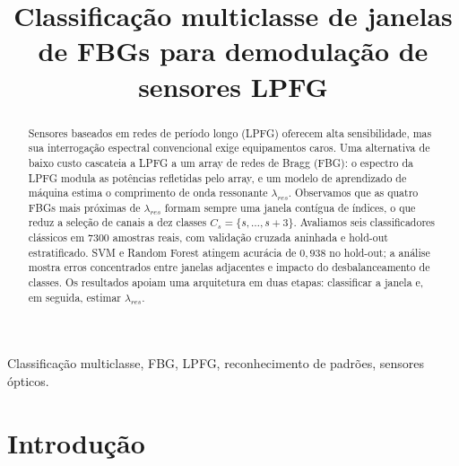 \documentclass[conference]{IEEEtran}
\begin{document}
\title{Classificação multiclasse de janelas de FBGs para demodulação de sensores LPFG}

\author{
\and
{}
}

\maketitle

\begin{abstract}
Sensores baseados em redes de período longo (LPFG) oferecem alta sensibilidade, mas sua interrogação espectral convencional exige equipamentos caros.
Uma alternativa de baixo custo cascateia a LPFG a um array de redes de Bragg (FBG): o espectro da LPFG modula as potências refletidas pelo array, e um modelo de aprendizado de máquina estima o comprimento de onda ressonante $\lambda_{res}$.
Observamos que as quatro FBGs mais próximas de $\lambda_{res}$ formam sempre uma janela contígua de índices, o que reduz a seleção de canais a dez classes $C_s=\{s,\ldots,s+3\}$.
Avaliamos seis classificadores clássicos em $7300$ amostras reais, com validação cruzada aninhada e hold-out estratificado.
SVM e Random Forest atingem acurácia de $0{,}938$ no hold-out; a análise mostra erros concentrados entre janelas adjacentes e impacto do desbalanceamento de classes.
Os resultados apoiam uma arquitetura em duas etapas: classificar a janela e, em seguida, estimar $\lambda_{res}$.
\end{abstract}

\begin{IEEEkeywords}
Classificação multiclasse, FBG, LPFG, reconhecimento de padrões, sensores ópticos.
\end{IEEEkeywords}

\section{Introdução}
\end{document}
